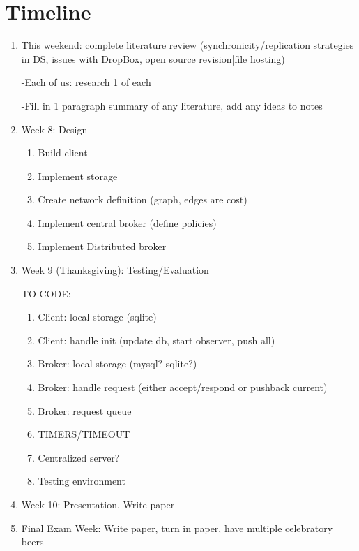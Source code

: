 \section{Timeline}
\begin{enumerate}
\item This weekend: complete literature review (synchronicity/replication strategies in DS, issues with DropBox, open source revision|file hosting)

-Each of us: research 1 of each

-Fill in 1 paragraph summary of any literature, add any ideas to notes

\item Week 8: Design
  \begin{enumerate}
    \item Build client
    \item Implement storage
    \item Create network definition (graph, edges are cost)
    \item Implement central broker (define policies)
    \item Implement Distributed broker
  \end{enumerate}
\item Week 9 (Thanksgiving): Testing/Evaluation
  
  TO CODE:
  \begin{enumerate}
    \item Client: local storage (sqlite)
    \item Client: handle init (update db, start observer, push all)
    \item Broker: local storage (mysql? sqlite?)
    \item Broker: handle request (either accept/respond or pushback current)
    \item Broker: request queue
    \item TIMERS/TIMEOUT
    \item Centralized server?
    \item Testing environment
  \end{enumerate}
\item Week 10: Presentation, Write paper
\item Final Exam Week: Write paper, turn in paper, have multiple celebratory beers
\end{enumerate}
